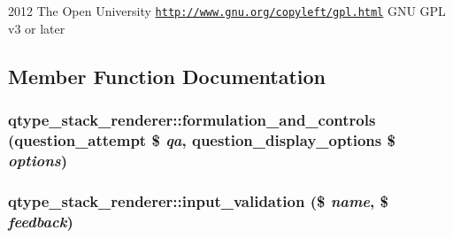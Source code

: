 2012 The Open University  \href{http://www.gnu.org/copyleft/gpl.html}{\tt http://www.gnu.org/copyleft/gpl.html} GNU GPL v3 or later 

\subsection{Member Function Documentation}
\hypertarget{classqtype__stack__renderer_ac8c6fd80afd18d2cd45eecaef608eee1}{
\subsubsection[{formulation\_\-and\_\-controls}]{\setlength{\rightskip}{0pt plus 5cm}qtype\_\-stack\_\-renderer::formulation\_\-and\_\-controls (question\_\-attempt \$ {\em qa}, \/  question\_\-display\_\-options \$ {\em options})}}
\label{classqtype__stack__renderer_ac8c6fd80afd18d2cd45eecaef608eee1}
\hypertarget{classqtype__stack__renderer_a45cc18a3803bc47ef05c95c21d2c08e9}{
\subsubsection[{input\_\-validation}]{\setlength{\rightskip}{0pt plus 5cm}qtype\_\-stack\_\-renderer::input\_\-validation (\$ {\em name}, \/  \$ {\em feedback})}}
\label{classqtype__stack__renderer_a45cc18a3803bc47ef05c95c21d2c08e9}

